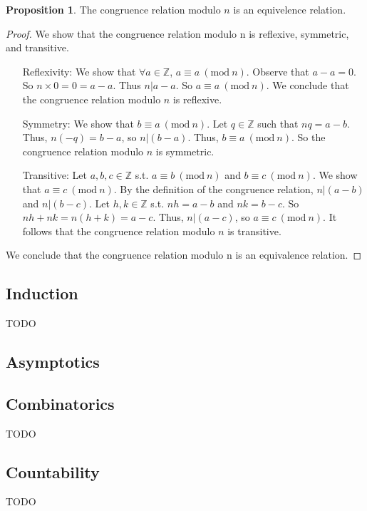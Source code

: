 \documentclass{article}
\theoremstyle{definition}
\newtheorem{prop}{Proposition}[subsection]
\newcommand{\modulo}[1]{\ (\mathrm{mod}\ #1)}
\begin{document}
\begin{prop}
The congruence relation modulo $n$ is an equivelence relation.
\end{prop}
\begin{proof}
We show that the congruence relation modulo n is reflexive, symmetric, and transitive.
\begin{itemize}[align=left]
\item[Reflexivity:] We show that $\forall a \in \mathbb{Z}$, $a \equiv a \modulo{n}$. Observe that $a-a=0$. So $n\times 0 = 0 = a-a$. Thus $n|a-a$. So $a \equiv a \modulo{n}$. We conclude that the congruence relation modulo $n$ is reflexive.

\item[Symmetry:] We show that $b \equiv a \modulo{n}$. Let $q \in \mathbb{Z}$ such that $nq = a-b$. Thus, $n(-q) = b-a$, so $n|(b-a)$. Thus, $b \equiv a \modulo{n}$. So the congruence relation modulo $n$ is symmetric.

\item[Transitive:] Let $a,b,c \in \mathbb{Z}$ s.t. $a \equiv b \modulo{n}$ and $b \equiv c \modulo{n}$. We show that $a \equiv c \modulo{n}$. By the definition of the congruence relation, $n|(a-b)$ and $n|(b-c)$. Let $h, k \in \mathbb{Z}$ s.t. $nh=a-b$ and $nk=b-c$. So $nh+nk=n(h+k)=a-c$. Thus, $n|(a-c)$, so $a\equiv c \modulo{n}$. It follows that the congruence relation modulo $n$ is transitive.
\end{itemize}
We conclude that the congruence relation modulo n is an equivalence relation.
\end{proof}



\subsection{Induction}
TODO

\subsection{Asymptotics}

\subsection{Combinatorics}
TODO

\subsection{Countability}
TODO
\end{document}
